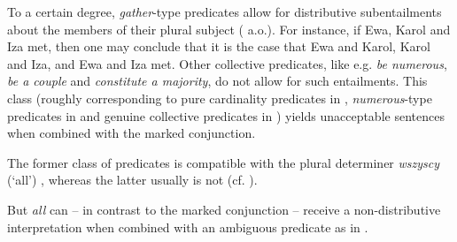 \documentclass[output=paper]{langscibook}
\begin{document}
\noindent To a certain degree, \textit{gather}-type predicates allow for distributive subentailments about the members of their plural subject (\citealt{Dowty:1987, Winter:2002, Hackl:2002, Champollion:2010} a.o.). For instance, if Ewa, Karol and Iza met, then one may conclude that it is the case that Ewa and Karol, Karol and Iza, and Ewa and Iza met. Other collective predicates, like e.g. \textit{be numerous}, \textit{be a couple} and \textit{constitute a majority}, do not allow for such entailments. This class (roughly corresponding to pure cardinality predicates in \citealt{Dowty:1987}{,} \textit{numerous}-type predicates in \citealt{Champollion:2010} and genuine collective predicates in \citealt{Hackl:2002}) yields unacceptable sentences when combined with the marked conjunction.

{\judgewidth{\#}%
\label{ros:num}
\label{ros:couple} 
\label{ros:majority} 
\z}

\noindent The former class of predicates is compatible with the plural determiner \textit{wszyscy} (`all') , whereas the latter usually is not  (cf. \citealt{Dowty:1987}).

{\judgewidth{\#}
\z}

\noindent But \textit{all} can -- in contrast to the marked conjunction -- receive a non-distributive interpretation when combined with an ambiguous predicate as in .
\end{document}
